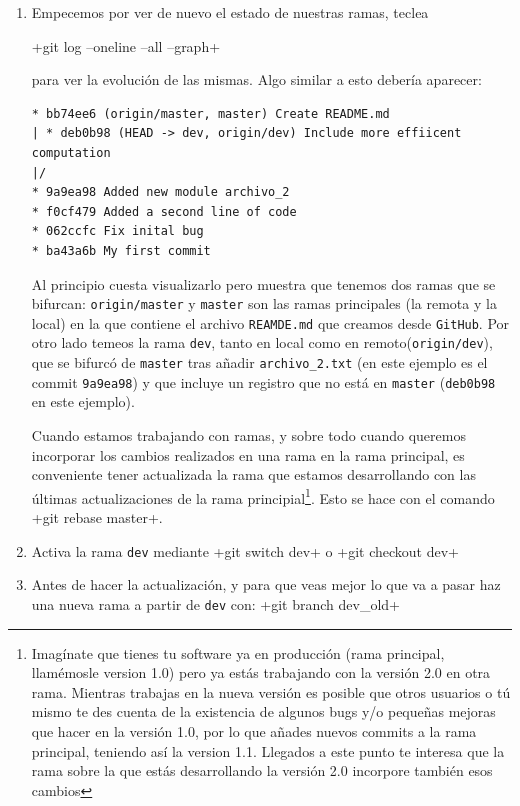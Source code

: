 \documentclass[a5paper, oneside,10pt]{article}
\begin{document}
    \begin{enumerate}
     \item Empecemos por ver de nuevo el estado de nuestras ramas, teclea
     
     \cverb+git log --oneline --all --graph+
     
     para ver la evolución de las mismas. Algo similar a esto debería aparecer:
     
     \begin{lstlisting}[style=custom]
* bb74ee6 (origin/master, master) Create README.md
| * deb0b98 (HEAD -> dev, origin/dev) Include more effiicent computation
|/  
* 9a9ea98 Added new module archivo_2
* f0cf479 Added a second line of code
* 062ccfc Fix inital bug
* ba43a6b My first commit
     \end{lstlisting}
    
    Al principio cuesta visualizarlo pero muestra que tenemos dos ramas que se bifurcan: \verb+origin/master+ y \verb+master+ son las ramas principales (la remota y la local) en la que contiene el archivo \verb+REAMDE.md+ que creamos desde \verb+GitHub+. Por otro lado temeos la rama \verb+dev+, tanto en local como en remoto(\verb+origin/dev+), que se bifurcó de \verb+master+ tras añadir \verb+archivo_2.txt+ (en este ejemplo es el commit \verb+9a9ea98+) y que incluye un registro que no está en \verb+master+ (\verb+deb0b98+ en este ejemplo). 
    
    Cuando estamos trabajando con ramas, y sobre todo cuando queremos incorporar los cambios realizados en una rama en la rama principal, es conveniente tener actualizada la rama que estamos desarrollando con las últimas actualizaciones de la rama principial\footnote{Imagínate que tienes tu software ya en producción (rama principal, llamémosle version 1.0) pero ya estás trabajando con la versión 2.0 en otra rama. Mientras trabajas en la nueva versión es posible que otros usuarios o tú mismo te des cuenta de la existencia de algunos bugs y/o pequeñas mejoras que hacer en la versión 1.0, por lo que añades nuevos commits a la rama principal, teniendo así la version 1.1. Llegados a este punto te interesa que la rama sobre la que estás desarrollando la versión 2.0 incorpore también esos cambios}. Esto se hace con el comando \cverb+git rebase master+.
    
    \item Activa la rama \verb+dev+ mediante \cverb+git switch dev+ o \cverb+git checkout dev+
    
    \item Antes de hacer la actualización, y para que veas mejor lo que va a pasar haz una nueva rama a partir de \verb+dev+ con:
    \cverb+git branch dev_old+
    

\end{enumerate}
\end{document}
